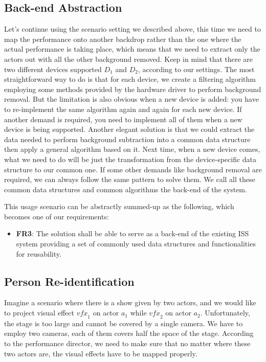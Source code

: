 \subsection{Back-end Abstraction}
\label{sec:intro-sq-abs}

Let's continue using the scenario setting we described above, this time we need
to map the performance onto another backdrop rather than the one where the
actual performance is taking place, which means that we need to extract only
the actors out with all the other background removed. Keep in mind that
there are two different devices supported $D_1$ and $D_2$, according to our
settings. The most straightforward way to do is that for each device, we
create a filtering algorithm employing some methods provided by the hardware
driver to perform background removal. But the limitation is also obvious when
a new device is added: you have to re-implement the same algorithm again and
again for each new device. If another demand is required, you need to implement all of them when a
new device is being supported.
Another elegant solution is that we could extract the data needed to perform
background subtraction into a common data structure then apply a general
algorithm based on it. Next time, when a new device comes, what we need to do
will be just the transformation from the device-specific data structure to our
common one. If some other demands like background removal are required, we can
always follow the same pattern to solve them. We call all these common data structures
and common algorithms the back-end of the system.

This usage scenario can be abstractly summed-up as the following, which becomes
one of our requirements:

\begin{itemize}
    \item \textbf{FR3}: The solution shall be able to serve as a back-end of the
	existing ISS system providing a set of commonly used data structures and
	functionalities for reusability.
\end{itemize}

\subsection{Person Re-identification}
\label{sec:intro-sq-reid}

Imagine a scenario where there is a show given by two actors, and we would like to
project visual effect $\mathit{vfx}_1$ on actor $a_1$ while $\mathit{vfx}_2$ on
actor $a_2$.
Unfortunately, the stage is too large and cannot be covered by a single camera.
We have to employ two cameras, each of them covers half the space of the stage.
According to the performance director, we need to make sure that no matter
where these two actors are, the visual effects have to be mapped properly.

